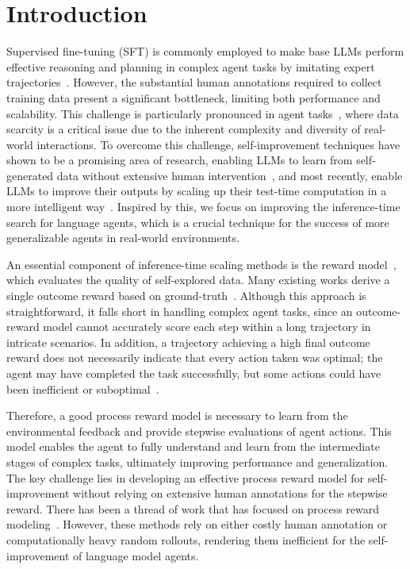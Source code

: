 \section{Introduction}
\label{sec:introduction}



Supervised fine-tuning (SFT) is commonly employed to make base LLMs perform effective reasoning and planning in complex agent tasks by imitating expert trajectories~\citep{chen2023fireact,yin2024lumos}. 
However, the substantial human annotations required to collect training data present a significant bottleneck, limiting both performance and scalability. 
This challenge is particularly pronounced in agent tasks~\citep{yao2022webshop, shridhar2021alfworld, wang2022scienceworld}, where data scarcity is a critical issue due to the inherent complexity and diversity of real-world interactions. 
To overcome this challenge, self-improvement techniques have shown to be a promising area of research, enabling LLMs to learn from self-generated data without extensive human intervention~\citep{wang2022learning, singh2023rest-em, vstar, zhang2024rest-mcts}, and most recently, enable LLMs to improve their outputs by scaling up their test-time computation in a more intelligent way~\cite{wang2024q*, shinn2023reflexion, snell2024scaling}.
Inspired by this, we focus on improving the inference-time search for language agents, which is a crucial technique for the success of more generalizable agents in real-world environments. 
% 

An essential component of inference-time scaling methods is the reward model~\citep{snell2024scaling}, which evaluates the quality of self-explored data. Many existing works derive a single outcome reward based on ground-truth~\citep{wang2024q*, shinn2023reflexion}. Although this approach is straightforward, it falls short in handling complex agent tasks, since an outcome-reward model cannot accurately score each step within a long trajectory in intricate scenarios. In addition, a trajectory achieving a high final outcome reward does not necessarily indicate that every action taken was optimal; the agent may have completed the task successfully, but some actions could have been inefficient or suboptimal~\citep{mathprocessoutcome}.

Therefore, a good process reward model is necessary to learn from the environmental feedback and provide stepwise evaluations of agent actions. This model enables the agent to fully understand and learn from the intermediate stages of complex tasks, ultimately improving performance and generalization. The key challenge lies in developing an effective process reward model for self-improvement without relying on extensive human annotations for the stepwise reward. There has been a thread of work that has focused on process reward modeling~\citep{mathprocessoutcome, verifystepbystep, math-shepherd, autoprm-chen-etal-2024}. However, these methods rely on either costly human annotation or computationally heavy random rollouts, rendering them inefficient for the self-improvement of language model agents.

